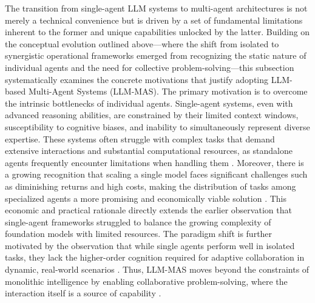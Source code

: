\documentclass[11pt]{article}
\begin{document}
The transition from single-agent LLM systems to multi-agent architectures is not merely a technical convenience but is driven by a set of fundamental limitations inherent to the former and unique capabilities unlocked by the latter. Building on the conceptual evolution outlined above---where the shift from isolated to synergistic operational frameworks emerged from recognizing the static nature of individual agents and the need for collective problem-solving---this subsection systematically examines the concrete motivations that justify adopting LLM-based Multi-Agent Systems (LLM-MAS). The primary motivation is to overcome the intrinsic bottlenecks of individual agents. Single-agent systems, even with advanced reasoning abilities, are constrained by their limited context windows, susceptibility to cognitive biases, and inability to simultaneously represent diverse expertise. These systems often struggle with complex tasks that demand extensive interactions and substantial computational resources, as standalone agents frequently encounter limitations when handling them \cite{ref23}. Moreover, there is a growing recognition that scaling a single model faces significant challenges such as diminishing returns and high costs, making the distribution of tasks among specialized agents a more promising and economically viable solution \cite{ref24}. This economic and practical rationale directly extends the earlier observation that single-agent frameworks struggled to balance the growing complexity of foundation models with limited resources. The paradigm shift is further motivated by the observation that while single agents perform well in isolated tasks, they lack the higher-order cognition required for adaptive collaboration in dynamic, real-world scenarios \cite{ref25}. Thus, LLM-MAS moves beyond the constraints of monolithic intelligence by enabling collaborative problem-solving, where the interaction itself is a source of capability \cite{ref2}.
\end{document}
